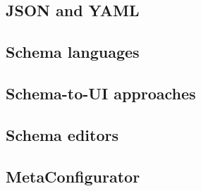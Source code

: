 \subsection{JSON and YAML}


\subsection{Schema languages}



\subsection{Schema-to-UI approaches} %



\subsection{Schema editors}



\subsection{MetaConfigurator}